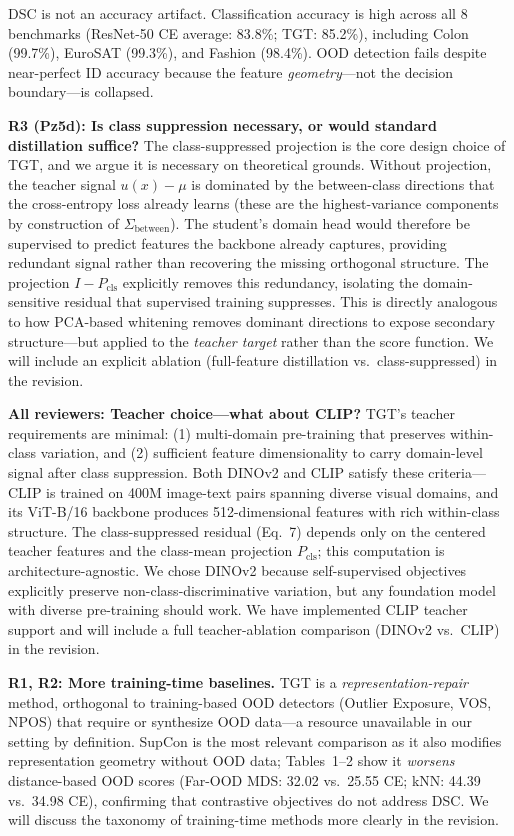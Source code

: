 \documentclass[runningheads]{llncs}
\begin{document}
DSC is not an accuracy artifact. Classification accuracy is high across all 8 benchmarks (ResNet-50 CE average: 83.8\%; TGT: 85.2\%), including Colon (99.7\%), EuroSAT (99.3\%), and Fashion (98.4\%). OOD detection fails despite near-perfect ID accuracy because the feature \emph{geometry}---not the decision boundary---is collapsed.

\medskip
\noindent\textbf{R3 (Pz5d): Is class suppression necessary, or would standard distillation suffice?}
The class-suppressed projection is the core design choice of TGT, and we argue it is necessary on theoretical grounds. Without projection, the teacher signal $u(x) - \mu$ is dominated by the between-class directions that the cross-entropy loss already learns (these are the highest-variance components by construction of $\Sigma_\text{between}$). The student's domain head would therefore be supervised to predict features the backbone already captures, providing redundant signal rather than recovering the missing orthogonal structure. The projection $I - P_\text{cls}$ explicitly removes this redundancy, isolating the domain-sensitive residual that supervised training suppresses. This is directly analogous to how PCA-based whitening removes dominant directions to expose secondary structure---but applied to the \emph{teacher target} rather than the score function. We will include an explicit ablation (full-feature distillation vs.\ class-suppressed) in the revision.

\medskip
\noindent\textbf{All reviewers: Teacher choice---what about CLIP?}
TGT's teacher requirements are minimal: (1) multi-domain pre-training that preserves within-class variation, and (2) sufficient feature dimensionality to carry domain-level signal after class suppression. Both DINOv2 and CLIP satisfy these criteria---CLIP is trained on 400M image-text pairs spanning diverse visual domains, and its ViT-B/16 backbone produces 512-dimensional features with rich within-class structure. The class-suppressed residual (Eq.~7) depends only on the centered teacher features and the class-mean projection $P_\text{cls}$; this computation is architecture-agnostic. We chose DINOv2 because self-supervised objectives explicitly preserve non-class-discriminative variation, but any foundation model with diverse pre-training should work. We have implemented CLIP teacher support and will include a full teacher-ablation comparison (DINOv2 vs.\ CLIP) in the revision.

\medskip
\noindent\textbf{R1, R2: More training-time baselines.}
TGT is a \emph{representation-repair} method, orthogonal to training-based OOD detectors (Outlier Exposure, VOS, NPOS) that require or synthesize OOD data---a resource unavailable in our setting by definition. SupCon is the most relevant comparison as it also modifies representation geometry without OOD data; Tables~1--2 show it \emph{worsens} distance-based OOD scores (Far-OOD MDS: 32.02 vs.\ 25.55 CE; kNN: 44.39 vs.\ 34.98 CE), confirming that contrastive objectives do not address DSC. We will discuss the taxonomy of training-time methods more clearly in the revision.
\end{document}
